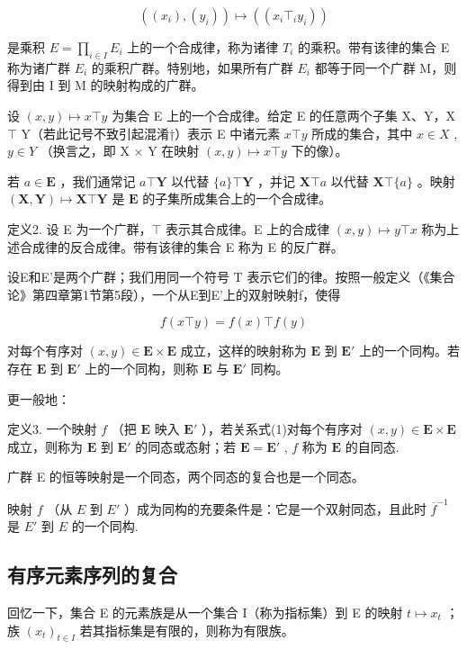 \[
((x _ {i}), (y _ {i})) \mapsto ((x _ {i} \top_ {i} y _ {i}))
\]

是乘积 \(E = \prod_{i \in I} E_i\) 上的一个合成律，称为诸律 \(T_i\) 的乘积。带有该律的集合 E 称为诸广群 \(E_i\) 的乘积广群。特别地，如果所有广群 \(E_i\) 都等于同一个广群 M，则得到由 I 到 M 的映射构成的广群。

设 \((x,y)\mapsto x\top y\) 为集合 E 上的一个合成律。给定 E 的任意两个子集 X、Y，X \(\top\) Y（若此记号不致引起混淆†）表示 E 中诸元素 \(x\top y\) 所成的集合，其中 \(x\in X\) , \(y\in Y\) （换言之，即 X \(\times\) Y 在映射 \((x,y)\mapsto x\top y\) 下的像）。

若 \(a \in \mathbf{E}\) ，我们通常记 \(a \top \mathbf{Y}\) 以代替 \(\{a\} \top \mathbf{Y}\) ，并记 \(\mathbf{X} \top a\) 以代替 \(\mathbf{X} \top \{a\}\) 。映射 \((\mathbf{X}, \mathbf{Y}) \mapsto \mathbf{X} \top \mathbf{Y}\) 是 \(\mathbf{E}\) 的子集所成集合上的一个合成律。

定义2. 设 E 为一个广群，\(\top\) 表示其合成律。E 上的合成律 \((x, y) \mapsto y \top x\) 称为上述合成律的反合成律。带有该律的集合 E 称为 E 的反广群。

设E和E'是两个广群；我们用同一个符号 T 表示它们的律。按照一般定义（《集合论》第四章第1节第5段），一个从E到E'上的双射映射f，使得

\[
f (x \top y) = f (x) \top f (y)\tag{1}
\]

对每个有序对 \((x, y) \in \mathbf{E} \times \mathbf{E}\) 成立，这样的映射称为 \(\mathbf{E}\) 到 \(\mathbf{E}'\) 上的一个同构。若存在 \(\mathbf{E}\) 到 \(\mathbf{E}'\) 上的一个同构，则称 \(\mathbf{E}\) 与 \(\mathbf{E}'\) 同构。

更一般地：

定义3. 一个映射 \(f\) （把 \(\mathbf{E}\) 映入 \(\mathbf{E}'\) ），若关系式(1)对每个有序对 \((x, y) \in \mathbf{E} \times \mathbf{E}\) 成立，则称为 \(\mathbf{E}\) 到 \(\mathbf{E}'\) 的同态或态射；若 \(\mathbf{E} = \mathbf{E}'\) , \(f\) 称为 \(\mathbf{E}\) 的自同态.

广群 E 的恒等映射是一个同态，两个同态的复合也是一个同态。

映射 \(f\) （从 \(E\) 到 \(E'\) ）成为同构的充要条件是：它是一个双射同态，且此时 \(\overline{f}^{-1}\) 是 \(E'\) 到 \(E\) 的一个同构.

\subsection{有序元素序列的复合}

回忆一下，集合 E 的元素族是从一个集合 I（称为指标集）到 E 的映射 \(t \mapsto x_{t}\) ；族 \((x_{t})_{t \in I}\) 若其指标集是有限的，则称为有限族。

